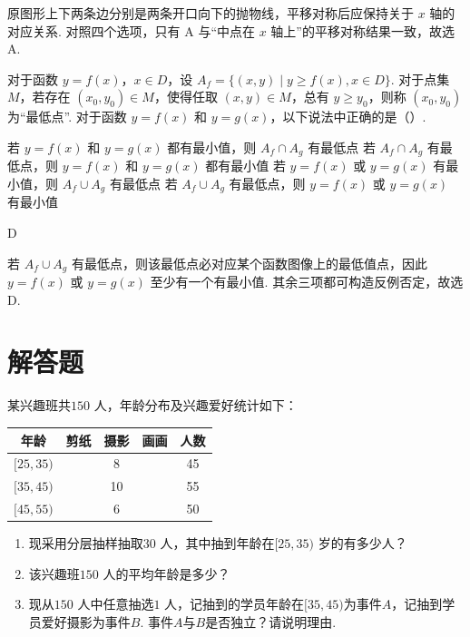 \begin{solution}
原图形上下两条边分别是两条开口向下的抛物线，平移对称后应保持关于 \(x\) 轴的对应关系. 对照四个选项，只有 A 与“中点在 \(x\) 轴上”的平移对称结果一致，故选 A.
\end{solution}

\begin{problem}
对于函数 \(y=f(x)\)，\(x\in D\)，设 \(A_f=\{(x,y)\mid y\ge f(x),x\in D\}\). 对于点集 \(M\)，若存在 \((x_0,y_0)\in M\)，使得任取 \((x,y)\in M\)，总有 \(y\ge y_0\)，则称 \((x_0,y_0)\) 为“最低点”. 对于函数 \(y=f(x)\) 和 \(y=g(x)\)，以下说法中正确的是（\quad）.

\choices
    {若 \(y=f(x)\) 和 \(y=g(x)\) 都有最小值，则 \(A_f\cap A_g\) 有最低点}
    {若 \(A_f\cap A_g\) 有最低点，则 \(y=f(x)\) 和 \(y=g(x)\) 都有最小值}
    {若 \(y=f(x)\) 或 \(y=g(x)\) 有最小值，则 \(A_f\cup A_g\) 有最低点}
    {若 \(A_f\cup A_g\) 有最低点，则 \(y=f(x)\) 或 \(y=g(x)\) 有最小值}
\end{problem}

\begin{answer}
D
\end{answer}

\begin{solution}
若 \(A_f\cup A_g\) 有最低点，则该最低点必对应某个函数图像上的最低值点，因此 \(y=f(x)\) 或 \(y=g(x)\) 至少有一个有最小值. 其余三项都可构造反例否定，故选 D.
\end{solution}

\section{解答题}

\begin{problem}
某兴趣班共\(150\text{ 人}\)，年龄分布及兴趣爱好统计如下：

\begin{center}
\renewcommand{\arraystretch}{1.25}
\begin{tabular}{|c|c|c|c|c|}
\hline
年龄 & 剪纸 & 摄影 & 画画 & 人数 \\
\hline
\([25,35)\) & & 8 & & 45 \\
\hline
\([35,45)\) & & 10 & & 55 \\
\hline
\([45,55)\) & & 6 & & 50 \\
\hline
\end{tabular}
\end{center}

\begin{enumerate}
\item 现采用分层抽样抽取\(30\text{ 人}\)，其中抽到年龄在\([25,35)\text{ 岁}\)的有多少人？
\item 该兴趣班\(150\text{ 人}\)的平均年龄是多少？
\item 现从\(150\text{ 人}\)中任意抽选\(1\text{ 人}\)，记抽到的学员年龄在\([35,45)\)为事件\(A\)，记抽到学员爱好摄影为事件\(B\). 事件\(A\)与\(B\)是否独立？请说明理由.
\end{enumerate}
\end{problem}

